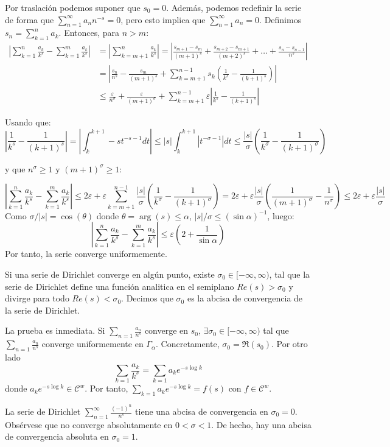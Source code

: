\documentclass[TAN.tex]{subfiles}
\begin{document}
\begin{dem}
Por traslación podemos suponer que $s_0=0$. Además, podemos redefinir la serie de forma que $\sum_{n=1}^\infty a_n n^{-s} = 0$, pero esto implica que $\sum_{n=1}^\infty a_n = 0$. Definimos $s_n = \sum_{k=1}^n a_k$. Entonces, para $n>m$:
\begin{align*}
\left|\sum_{k=1}^n\frac{a_k}{k^s}-\sum_{k=1}^m\frac{a_k}{k^s}\right| &= \left|\sum_{k=m+1}^n\frac{a_k}{k^s}\right| = \left|\frac{s_{m+1}-s_m}{(m+1)^s} + \frac{s_{m+2}-s_{m+1}}{(m+2)^s}+\dots+\frac{s_{n}-s_{n-1}}{n^s}\right|\\
&= \left|\frac{s_n}{n^s}-\frac{s_m}{(m+1)^s}+\sum_{k=m+1}^{n-1}s_k\left(\frac{1}{k^s}-\frac{1}{(k+1)^s}\right)\right|\\
& ≤ \frac{\varepsilon}{n^σ} + \frac{\varepsilon}{(m+1)^σ} + \sum_{k=m+1}^{n-1} \varepsilon \left|\frac{1}{k^s}-\frac{1}{(k+1)^s}\right|
\end{align*}

Usando que:
\[ \left|\frac{1}{k^s}-\frac{1}{(k+1)^s}\right| = \left|\int_k^{k+1}-st^{-s-1}dt\right| ≤ |s|\int_k^{k+1}\left|t^{-σ-1}\right|dt ≤ \frac{|s|}{σ} \left(\frac{1}{k^σ}-\frac{1}{(k+1)^σ}\right)\]

y que $n^σ ≥ 1$ y $(m+1)^σ ≥ 1$:

\[ \left|\sum_{k=1}^n\frac{a_k}{k^s}-\sum_{k=1}^m\frac{a_k}{k^s}\right| ≤ 2\varepsilon + \varepsilon \sum_{k=m+1}^{n-1} \frac{|s|}{σ}\left(\frac{1}{k^σ}-\frac{1}{(k+1)^σ}\right) = 2\varepsilon+\varepsilon\frac{|s|}{σ}\left(\frac{1}{(m+1)^σ}-\frac{1}{n^σ}\right) ≤ 2\varepsilon+\varepsilon\frac{|s|}{σ} \]
Como $σ/|s| = \cos(θ)$ donde $θ = \arg(s) ≤ α$, $|s|/σ ≤ (\sin α)^{-1}$, luego:
\[ \left|\sum_{k=1}^n\frac{a_k}{k^s}-\sum_{k=1}^m\frac{a_k}{k^s}\right| ≤ \varepsilon\left(2+\frac{1}{\sin α}\right) \]
Por tanto, la serie converge uniformemente.
\end{dem}

\begin{coro}
Si una serie de Dirichlet converge en algún punto, existe $σ_0 \in [-\infty,\infty)$, tal que la serie de Dirichlet define una función analitica en el semiplano $Re(s) > σ_0$ y divirge para todo $Re(s) < σ_0$. Decimos que $σ_0$ es la abcisa de convergencia de la serie de Dirichlet.
\end{coro}
\begin{dem}
La prueba es inmediata. Si $\sum_{n=1}\frac{a_n}{n^s}$ converge en $s_0$, $\exists \sigma_0\in[-\infty,\infty)$ tal que $\sum_{n=1}\frac{a_n}{n^s}$ converge uniformemente en $\Gamma_\alpha$. Concretamente, $\sigma_0 = \Re(s_0)$. Por otro lado
$$
\sum_{k=1} \frac{a_k}{k^s} = \sum_{k=1}a_ke^{-s\log k}
$$
donde $a_ke^{-s\log k}\in \mathcal{C}^w$. Por tanto, $\sum_{k=1}a_ke^{-s\log k} = f(s)$ con $f\in \mathcal{C}^w$.
\end{dem}
\begin{ej}
La serie de Dirichlet $\sum_{n=1}^\infty \frac{(-1)^n}{n^s}$ tiene una abcisa de convergencia en $σ_0=0$. Obsérvese que no converge absolutamente en $0<σ<1$. De hecho, hay una abcisa de convergencia absoluta en $σ_0=1$.
\end{ej}
\end{document}
